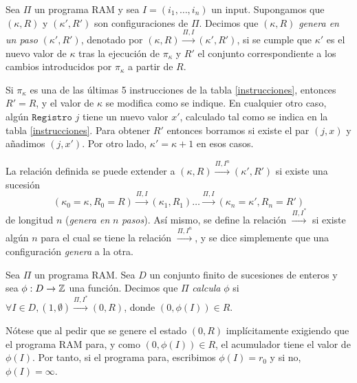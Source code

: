 \documentclass[twoside]{article}
\newcommand{\yields}{\overset{\Pi,I^*}{\rightarrow}}
\begin{document}
\newpage

\begin{defi}
Sea $\Pi$ un programa RAM y sea $I=(i_1,\dots,i_n)$ un input. Supongamos que $(\kappa,R)$ y $(\kappa',R')$ son configuraciones de $\Pi$. Decimos que $(\kappa,R)$ \emph{genera en un paso} $(\kappa',R')$, denotado por $(\kappa,R)\overset{\Pi,I}{\rightarrow}(\kappa',R')$, si se cumple que $\kappa'$ es el nuevo valor de $\kappa$ tras la ejecución de $\pi_\kappa$ y $R'$ el conjunto correspondiente a los cambios introducidos por $\pi_\kappa$ a partir de $R$. 
\end{defi}

Si $\pi_\kappa$ es una de las últimas 5 instrucciones de la tabla \ref{instrucciones}, entonces $R'=R$, y el valor de $\kappa$ se modifica como se indique. En cualquier otro caso, algún $\texttt{Registro }j$ tiene un nuevo valor $x'$, calculado tal como se indica en la tabla \ref{instrucciones}. Para obtener $R'$ entonces borramos si existe el par $(j,x)$ y añadimos $(j,x')$. Por otro lado, $\kappa'=\kappa+1$ en esos casos. 

La relación definida se puede extender a  $(\kappa,R)\overset{\Pi,I^n}{\rightarrow}(\kappa',R')$ si existe una sucesión  $$(\kappa_0=\kappa,R_0=R)\overset{\Pi,I}{\rightarrow} (\kappa_1,R_1)\dots\overset{\Pi,I}{\rightarrow}(\kappa_n=\kappa',R_n=R')$$ de longitud $n$ (\emph{genera en }$n$\emph{ pasos}). Así mismo, se define la relación $\overset{\Pi,I^*}{\rightarrow}$ si existe algún $n$ para el cual se tiene la relación $\overset{\Pi,I^n}{\rightarrow}$, y se dice simplemente que una configuración \emph{genera} a la otra.

\begin{defi}
Sea $\Pi$ un programa RAM. Sea $D$ un conjunto finito de sucesiones de enteros y sea $\phi:D\to\mathbb{Z}$ una función. Decimos que $\Pi$ \emph{calcula} $\phi$ si $\forall I\in D, (1,\emptyset)\yields(0,R)$, donde $(0,\phi(I))\in R$. 
\end{defi}

Nótese que al pedir que se genere el estado $(0,R)$ implícitamente exigiendo que el programa RAM para, y como $(0,\phi(I))\in R$, el acumulador tiene el valor de $\phi(I)$. Por tanto, si el programa para, escribimos $\phi(I)=r_0$ y si no, $\phi(I)=\infty$.

\newpage
\end{document}
